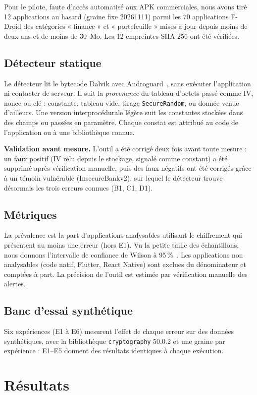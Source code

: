 \documentclass[conference,a4paper]{IEEEtran}
\begin{document}
Pour le pilote, faute d'accès automatisé aux APK commerciales, nous avons tiré 12 applications au hasard (graine fixe 20261111) parmi les 70 applications F-Droid des catégories « finance » et « portefeuille » mises à jour depuis moins de deux ans et de moins de 30~Mo. Les 12 empreintes SHA-256 ont été vérifiées.

\subsection{Détecteur statique}
Le détecteur lit le bytecode Dalvik avec Androguard~\cite{androguard}, sans exécuter l'application ni contacter de serveur. Il suit la \emph{provenance} du tableau d'octets passé comme IV, nonce ou clé : constante, tableau vide, tirage \texttt{SecureRandom}, ou donnée venue d'ailleurs. Une version interprocédurale légère suit les constantes stockées dans des champs ou passées en paramètre. Chaque constat est attribué au code de l'application ou à une bibliothèque connue.

\textbf{Validation avant mesure.} L'outil a été corrigé deux fois avant toute mesure : un faux positif (IV relu depuis le stockage, signalé comme constant) a été supprimé après vérification manuelle, puis des faux négatifs ont été corrigés grâce à un témoin vulnérable (InsecureBankv2), sur lequel le détecteur trouve désormais les trois erreurs connues (B1, C1, D1).

\subsection{Métriques}
La prévalence est la part d'applications analysables utilisant le chiffrement qui présentent au moins une erreur (hors E1). Vu la petite taille des échantillons, nous donnons l'intervalle de confiance de Wilson à 95\,\%~\cite{wilson1927}. Les applications non analysables (code natif, Flutter, React Native) sont exclues du dénominateur et comptées à part. La précision de l'outil est estimée par vérification manuelle des alertes.

\subsection{Banc d'essai synthétique}
Six expériences (E1 à E6) mesurent l'effet de chaque erreur sur des données synthétiques, avec la bibliothèque \texttt{cryptography} 50.0.2 et une graine par expérience : E1--E5 donnent des résultats identiques à chaque exécution.

\section{Résultats}
\end{document}
